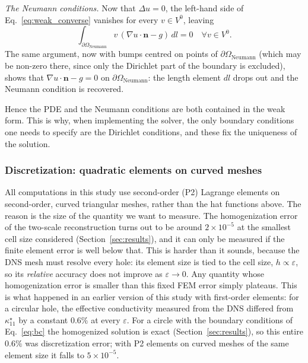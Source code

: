 \documentclass{article}
\makeatletter
\providecommand\FloatBarrier{\par\begingroup\let\@elt\relax
  \edef\@tempa{\@botlist\@deferlist\@dbldeferlist}%
  \ifx\@tempa\@empty\else\clearpage\fi\endgroup}
\newcommand{\tmop}[1]{\ensuremath{\operatorname{#1}}}
\makeatother
\begin{document}
\emph{The Neumann conditions.} Now that $\Delta u = 0$, the left-hand side of
Eq.~\eqref{eq:weak_converse} vanishes for every $v \in V^0$, leaving
\[ \int_{\partial \Omega_{\tmop{Neumann}}} v \, (\nabla u \cdot \mathbf{n} - g) \,
   dl = 0 \quad \forall v \in V^0 . \]
The same argument, now with bumps centred on points of $\partial
\Omega_{\tmop{Neumann}}$ (which may be non-zero there, since only the Dirichlet
part of the boundary is excluded), shows that $\nabla u \cdot \mathbf{n} - g = 0$
on $\partial \Omega_{\tmop{Neumann}}$: the length element $dl$ drops out and the
Neumann condition is recovered.

Hence the PDE and the Neumann conditions are both contained in the weak form.
This is why, when implementing the solver, the only boundary conditions one
needs to specify are the Dirichlet conditions, and these fix the uniqueness of
the solution.

\FloatBarrier
\subsubsection{Discretization: quadratic elements on curved meshes}
\label{sec:p2}

All computations in this study use second-order (P2) Lagrange elements on
second-order, curved triangular meshes, rather than the hat functions above.
The reason is the size of the quantity we want to measure. The homogenization
error of the two-scale reconstruction turns out to be around $2\times10^{-5}$ at
the smallest cell size considered (Section~\ref{sec:results}), and it can only be
measured if the finite element error is well below that. This is harder than it
sounds, because the DNS mesh must resolve every hole: its element size is tied
to the cell size, $h \propto \varepsilon$, so its \emph{relative} accuracy does not
improve as $\varepsilon \to 0$. Any quantity whose homogenization error is smaller
than this fixed FEM error simply plateaus. This is what happened in an earlier
version of this study with first-order elements: for a circular hole, the
effective conductivity measured from the DNS differed from $\kappa^{\star}_{11}$ by
a constant $0.6\%$ at every $\varepsilon$. For a circle with the boundary
conditions of Eq.~\eqref{eq:bc} the homogenized solution is exact
(Section~\ref{sec:results}), so this entire $0.6\%$ was discretization error; with
P2 elements on curved meshes of the same element size it falls to $5\times10^{-5}$.
\end{document}
